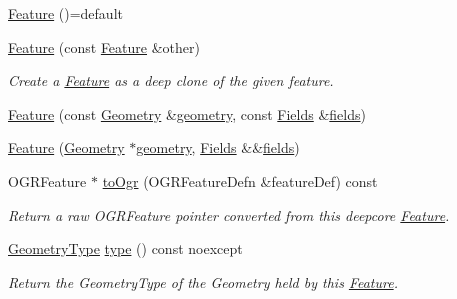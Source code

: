 \begin{DoxyCompactItemize}
\item 
\hyperlink{classdg_1_1deepcore_1_1vector_1_1_feature_af7032e28bfb20039016e379a8d01bbc1}{Feature} ()=default
\item 
\hyperlink{classdg_1_1deepcore_1_1vector_1_1_feature_ab8dbb8d6de715975feabacaaff5adba9}{Feature} (const \hyperlink{classdg_1_1deepcore_1_1vector_1_1_feature}{Feature} \&other)
\begin{DoxyCompactList}\small\item\em Create a \hyperlink{classdg_1_1deepcore_1_1vector_1_1_feature}{Feature} as a deep clone of the given feature. \end{DoxyCompactList}\item 
\hyperlink{classdg_1_1deepcore_1_1vector_1_1_feature_adddae739d09abc8ef57106a2382f9394}{Feature} (const \hyperlink{structdg_1_1deepcore_1_1geometry_1_1_geometry}{Geometry} \&\hyperlink{classdg_1_1deepcore_1_1vector_1_1_feature_af5ba964b4c660e021e4e99e1752462b4}{geometry}, const \hyperlink{group___vector_module_gabeca0d4b0cbea4335ae890255ca59128}{Fields} \&\hyperlink{classdg_1_1deepcore_1_1vector_1_1_feature_a932740031038833666cd2afd1ada92f4}{fields})
\item 
\hyperlink{classdg_1_1deepcore_1_1vector_1_1_feature_a843977ce099e283f26a366501173fe5a}{Feature} (\hyperlink{structdg_1_1deepcore_1_1geometry_1_1_geometry}{Geometry} $\ast$\hyperlink{classdg_1_1deepcore_1_1vector_1_1_feature_af5ba964b4c660e021e4e99e1752462b4}{geometry}, \hyperlink{group___vector_module_gabeca0d4b0cbea4335ae890255ca59128}{Fields} \&\&\hyperlink{classdg_1_1deepcore_1_1vector_1_1_feature_a932740031038833666cd2afd1ada92f4}{fields})
\item 
O\+G\+R\+Feature $\ast$ \hyperlink{classdg_1_1deepcore_1_1vector_1_1_feature_a741151fba7758f5b76ccee544c01dce3}{to\+Ogr} (O\+G\+R\+Feature\+Defn \&feature\+Def) const 
\begin{DoxyCompactList}\small\item\em Return a raw O\+G\+R\+Feature pointer converted from this deepcore \hyperlink{classdg_1_1deepcore_1_1vector_1_1_feature}{Feature}. \end{DoxyCompactList}\item 
\hyperlink{group___geometry_module_gad9a3ec0b998629dbcf8274512700964a}{Geometry\+Type} \hyperlink{classdg_1_1deepcore_1_1vector_1_1_feature_af8c970b232d0c9758603fed27ce4fbf0}{type} () const noexcept
\begin{DoxyCompactList}\small\item\em Return the Geometry\+Type of the Geometry held by this \hyperlink{classdg_1_1deepcore_1_1vector_1_1_feature}{Feature}. \end{DoxyCompactList}\end{DoxyCompactItemize}
